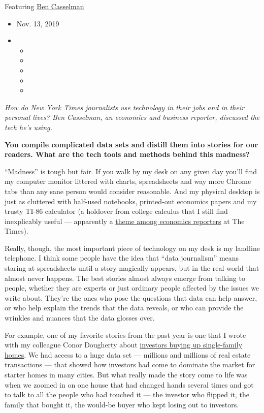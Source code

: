 Featuring \href{https://www.nytimes3xbfgragh.onion/by/ben-casselman}{Ben
Casselman}

\begin{itemize}
\item
  Nov. 13, 2019
\item
  \begin{itemize}
  \item
  \item
  \item
  \item
  \item
  \end{itemize}
\end{itemize}

\emph{How do New York Times journalists use technology in their jobs and
in their personal lives? Ben Casselman, an economics and business
reporter, discussed the tech he's using.}

\textbf{You compile complicated data sets and distill them into stories
for our readers. What are the tech tools and methods behind this
madness?}

``Madness'' is tough but fair. If you walk by my desk on any given day
you'll find my computer monitor littered with charts, spreadsheets and
way more Chrome tabs than any sane person would consider reasonable. And
my physical desktop is just as cluttered with half-used notebooks,
printed-out economics papers and my trusty TI-86 calculator (a holdover
from college calculus that I still find inexplicably useful ---
apparently a
\href{https://www.nytimes3xbfgragh.onion/2018/08/08/technology/personaltech/fred-economics-writers.html}{theme
among economics reporters} at The Times).

Really, though, the most important piece of technology on my desk is my
landline telephone. I think some people have the idea that ``data
journalism'' means staring at spreadsheets until a story magically
appears, but in the real world that almost never happens. The best
stories almost always emerge from talking to people, whether they are
experts or just ordinary people affected by the issues we write about.
They're the ones who pose the questions that data can help answer, or
who help explain the trends that the data reveals, or who can provide
the wrinkles and nuances that the data glosses over.

For example, one of my favorite stories from the past year is one that I
wrote with my colleague Conor Dougherty about
\href{https://www.nytimes3xbfgragh.onion/interactive/2019/06/20/business/economy/starter-homes-investors.html}{investors
buying up single-family homes}. We had access to a huge data set ---
millions and millions of real estate transactions --- that showed how
investors had come to dominate the market for starter homes in many
cities. But what really made the story come to life was when we zoomed
in on one house that had changed hands several times and got to talk to
all the people who had touched it --- the investor who flipped it, the
family that bought it, the would-be buyer who kept losing out to
investors.

